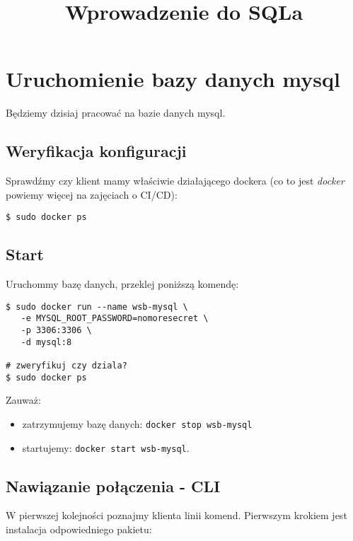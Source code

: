\documentclass[12pt, letterpaper]{article}
\title{{\Huge \textbf{Wprowadzenie do {SQLa}}}}
\date{}
\begin{document}
\begin{titlepage}
\maketitle
\end{titlepage}

\tableofcontents
\pagebreak
\section{Uruchomienie bazy danych mysql}

Będziemy dzisiaj pracować na bazie danych mysql.

\subsection{Weryfikacja konfiguracji}

Sprawdźmy czy klient mamy właściwie działającego dockera (co to jest \emph{docker}
powiemy więcej na zajęciach o {\small CI}/{\small CD}):

\begin{verbatim}
$ sudo docker ps
\end{verbatim}

\subsection{Start}
Uruchommy bazę danych, przeklej poniższą komendę:

\begin{verbatim}
$ sudo docker run --name wsb-mysql \
   -e MYSQL_ROOT_PASSWORD=nomoresecret \
   -p 3306:3306 \
   -d mysql:8

# zweryfikuj czy dziala?
$ sudo docker ps
\end{verbatim}

Zauważ:
\begin{itemize}
\item zatrzymujemy bazę danych: \texttt{docker stop wsb-mysql}
\item startujemy: \texttt{docker start wsb-mysql}.
\end{itemize}

\subsection{Nawiązanie połączenia - {\small CLI}}
W pierwszej kolejności poznajmy klienta linii komend. Pierwszym krokiem jest
instalacja odpowiedniego pakietu:
\end{document}
